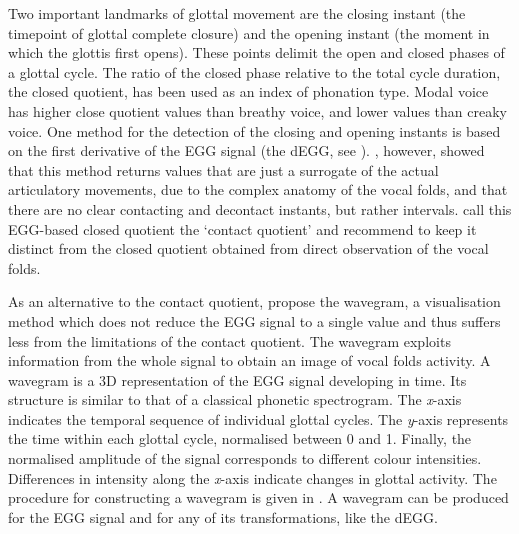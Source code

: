 \documentclass[
  11pt,
  a4paper,
]{article}
\begin{document}
Two important landmarks of glottal movement are the closing instant (the
timepoint of glottal complete closure) and the opening instant (the
moment in which the glottis first opens). These points delimit the open
and closed phases of a glottal cycle. The ratio of the closed phase
relative to the total cycle duration, the closed quotient, has been used
as an index of phonation type. Modal voice has higher close quotient
values than breathy voice, and lower values than creaky voice. One
method for the detection of the closing and opening instants is based on
the first derivative of the EGG signal (the dEGG, see ).
\citet{herbst2017}, however, showed that this method returns values that
are just a surrogate of the actual articulatory movements, due to the
complex anatomy of the vocal folds, and that there are no clear
contacting and decontact instants, but rather intervals.
\citet{herbst2017} call this EGG-based closed quotient the `contact
quotient' and recommend to keep it distinct from the closed quotient
obtained from direct observation of the vocal folds.

As an alternative to the contact quotient, \citet{herbst2010} propose
the wavegram, a visualisation method which does not reduce the EGG
signal to a single value and thus suffers less from the limitations of
the contact quotient. The wavegram exploits information from the whole
signal to obtain an image of vocal folds activity. A wavegram is a 3D
representation of the EGG signal developing in time. Its structure is
similar to that of a classical phonetic spectrogram. The \emph{x}-axis
indicates the temporal sequence of individual glottal cycles. The
\emph{y}-axis represents the time within each glottal cycle, normalised
between 0 and 1. Finally, the normalised amplitude of the signal
corresponds to different colour intensities. Differences in intensity
along the \emph{x}-axis indicate changes in glottal activity. The
procedure for constructing a wavegram is given in . A
wavegram can be produced for the EGG signal and for any of its
transformations, like the dEGG.
\end{document}
